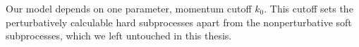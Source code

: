 \documentclass[a4paper, twoside, english, 12pt]{article}
\begin{document}
Our model depends on one parameter, momentum cutoff $k_0$. This cutoff sets the perturbatively calculable hard subprocesses apart from the nonperturbative soft subprocesses, which we left untouched in this thesis. 




\newpage
\nocite{*}
\label{lastpage}
\appendix
\newpage
\end{document}
